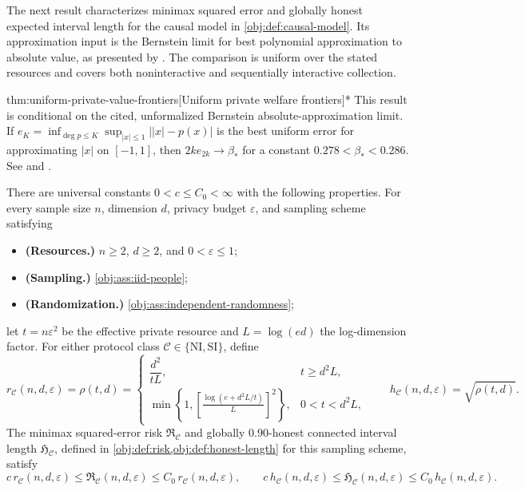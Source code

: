 The next result characterizes minimax squared error and globally honest expected interval length for the causal model in \cref{obj:def:causal-model}. Its approximation input is the Bernstein limit for best polynomial approximation to absolute value, as presented by \citet[Section 3.1, p.~8]{CaiLow2011Nonsmooth}. The comparison is uniform over the stated resources and covers both noninteractive and sequentially interactive collection.

\begin{theoremv}{thm:uniform-private-value-frontiers}[Uniform private welfare frontiers]*
This result is conditional on the cited, unformalized Bernstein absolute-approximation limit. If \(e_K=\inf_{\deg p\le K}\sup_{|x|\le1}\lvert |x|-p(x)\rvert\) is the best uniform error for approximating \(|x|\) on \([-1,1]\), then \(2k e_{2k}\to\beta_*\) for a constant \(0.278<\beta_*<0.286\). See \citet[Section 3.1]{CaiLow2011Nonsmooth} and \citet{Bernstein1913}.

There are universal constants \(0<c\le C_0<\infty\) with the following properties. For every sample size \(n\), dimension \(d\), privacy budget \(\varepsilon\), and sampling scheme satisfying
\begin{itemize}
\item \textbf{(Resources.)} \(n\ge2\), \(d\ge2\), and \(0<\varepsilon\le1\);
\item \textbf{(Sampling.)} \cref{obj:ass:iid-people};
\item \textbf{(Randomization.)} \cref{obj:ass:independent-randomness};
\end{itemize}
let \(t=n\varepsilon^2\) be the effective private resource and \(L=\log(ed)\) the log-dimension factor. For either protocol class \(\mathcal C\in\{\mathrm{NI},\mathrm{SI}\}\), define
\[
r_{\mathcal C}(n,d,\varepsilon)=\rho(t,d)=
\begin{cases}
\dfrac{d^2}{tL},&t\ge d^2L,\\[4pt]
\displaystyle\min\left\{1,
\left[\frac{\log(e+d^2L/t)}{L}\right]^2\right\},
&0<t<d^2L,
\end{cases}
\qquad
h_{\mathcal C}(n,d,\varepsilon)=\sqrt{\rho(t,d)}.
\]
The minimax squared-error risk \(\mathfrak R_{\mathcal C}\) and globally \(0.90\)-honest connected interval length \(\mathfrak H_{\mathcal C}\), defined in \cref{obj:def:risk,obj:def:honest-length} for this sampling scheme, satisfy
\[
c\,r_{\mathcal C}(n,d,\varepsilon)
\le \mathfrak R_{\mathcal C}(n,d,\varepsilon)
\le C_0\,r_{\mathcal C}(n,d,\varepsilon),
\qquad
c\,h_{\mathcal C}(n,d,\varepsilon)
\le \mathfrak H_{\mathcal C}(n,d,\varepsilon)
\le C_0\,h_{\mathcal C}(n,d,\varepsilon).
\]


\end{theoremv}
